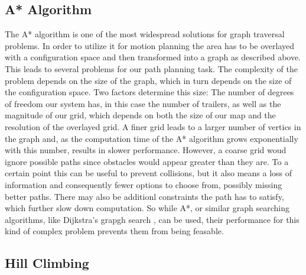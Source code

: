 \subsection{A* Algorithm}
\label{sec:a_star}

The A* algorithm is one of the most widespread solutions for graph traversal problems.\cite{8} In order to utilize it for motion planning the area has to be overlayed with a configuration space and then transformed into a graph as described above. This leads to several problems for our path planning task. The complexity of the problem depends on the size of the graph, which in turn depends on the size of the configuration space. Two factors determine this size: The number of degrees of freedom our system has, in this case the number of trailers, as well as the magnitude of our grid, which depends on both the size of our map and the resolution of the overlayed grid. A finer grid leads to a larger number of vertics in the graph and, as the computation time of the A* algorithm grows exponentially with this number, results in slower performance. However, a coarse grid woud ignore possible paths since obstacles would appear greater than they are. To a certain point this can be useful to prevent collisions, but it also means a loss of information and consequently fewer options to choose from, possibly missing better paths. There may also be additionl constraints the path has to satisfy, which further slow down computation. So while A*, or similar graph searching algorithms, like Dijkstra's grapgh search \cite{6}, can be used, their performance for this kind of complex problem prevents them from being feasable.

\subsection{Hill Climbing}
\label{sec:hill_climbing}


